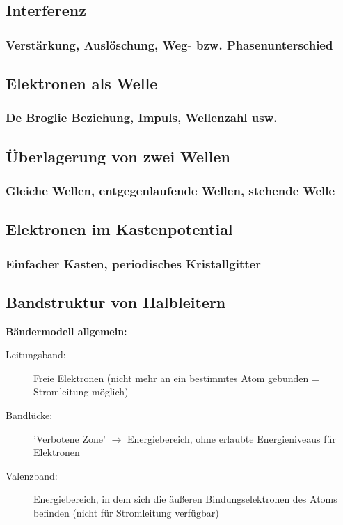 \subsection{Interferenz}
	\subsubsection{Verstärkung, Auslöschung, Weg- bzw. Phasenunterschied}
\subsection{Elektronen als Welle}
	\subsubsection{De Broglie Beziehung, Impuls, Wellenzahl usw.}
\subsection{Überlagerung von zwei Wellen}
	\subsubsection{Gleiche Wellen, entgegenlaufende Wellen, stehende Welle}
\subsection{Elektronen im Kastenpotential}
	\subsubsection{Einfacher Kasten, periodisches Kristallgitter}
\subsection{Bandstruktur von Halbleitern}
	\textbf{Bändermodell allgemein:}
	\begin{description}
		\item[Leitungsband:] Freie Elektronen (nicht mehr an ein bestimmtes Atom gebunden = Stromleitung möglich)
		\item[Bandlücke:] 'Verbotene Zone' $\rightarrow$ Energiebereich, ohne erlaubte Energieniveaus für Elektronen
		\item[Valenzband:] Energiebereich, in dem sich die äußeren Bindungselektronen des Atoms befinden (nicht für Stromleitung verfügbar) 
	\end{description}
	
